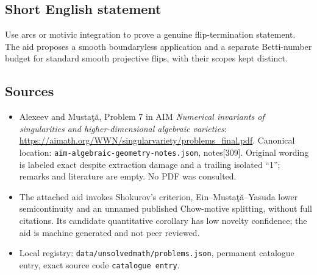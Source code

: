 \documentclass[11pt]{article}
\begin{document}
\subsection{Short English statement}
Use arcs or motivic integration to prove a genuine flip-termination statement. The aid proposes a smooth boundaryless application and a separate Betti-number budget for standard smooth projective flips, with their scopes kept distinct.
\subsection{Sources}
\begin{itemize}
\item Alexeev and Musta\c t\u a, Problem 7 in AIM \emph{Numerical invariants of singularities and higher-dimensional algebraic varieties}: \url{https://aimath.org/WWN/singularvariety/problems_final.pdf}. Canonical location: \texttt{aim-algebraic-geometry-notes.json}, notes[309]. Original wording is labeled exact despite extraction damage and a trailing isolated ``1''; remarks and literature are empty. No PDF was consulted.
\item The attached aid invokes Shokurov's criterion, Ein--Musta\c t\u a--Yasuda lower semicontinuity and an unnamed published Chow-motive splitting, without full citations. Its candidate quantitative corollary has low novelty confidence; the aid is machine generated and not peer reviewed.
\item Local registry: \texttt{data/unsolvedmath/problems.json}, permanent catalogue entry, exact source code \texttt{catalogue entry}.
\end{itemize}
\end{document}
